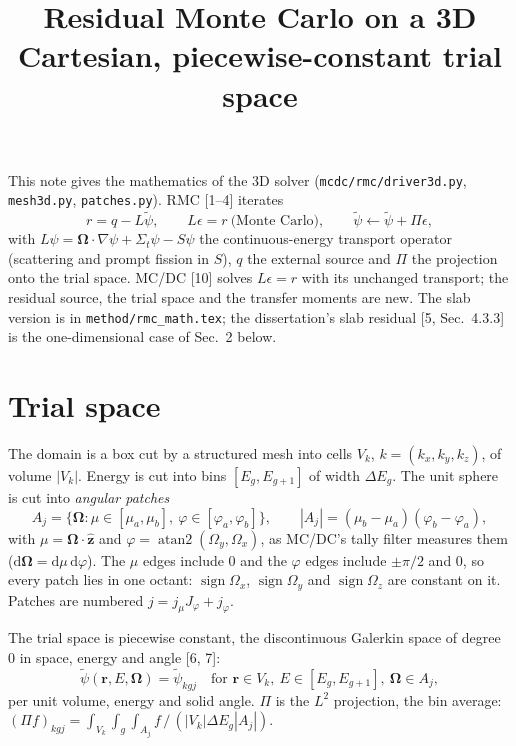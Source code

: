 \documentclass[11pt]{article}
\title{Residual Monte Carlo on a 3D Cartesian, piecewise-constant trial space}
\date{}
\newcommand{\tpsi}{\tilde\psi}
\newcommand{\Sigt}{\Sigma_t}
\newcommand{\Om}{\boldsymbol\Omega}
\begin{document}
\maketitle

\noindent This note gives the mathematics of the 3D solver
(\texttt{mcdc/rmc/driver3d.py}, \texttt{mesh3d.py}, \texttt{patches.py}). RMC
[1--4] iterates
\begin{equation}
  r = q - L\tpsi,\qquad L\epsilon = r\ \text{(Monte Carlo)},\qquad
  \tpsi \leftarrow \tpsi + \Pi\epsilon ,
\end{equation}
with $L\psi = \Om\cdot\nabla\psi + \Sigt\psi - S\psi$ the continuous-energy
transport operator (scattering and prompt fission in $S$), $q$ the external source
and $\Pi$ the projection onto the trial space. MC/DC [10] solves $L\epsilon=r$ with
its unchanged transport; the residual source, the trial space and the transfer
moments are new. The slab version is in \texttt{method/rmc\_math.tex}; the dissertation's
slab residual [5, Sec.~4.3.3] is the one-dimensional case of Sec.~2 below.

\section{Trial space}

The domain is a box cut by a structured mesh into cells $V_k$, $k=(k_x,k_y,k_z)$, of
volume $|V_k|$. Energy is cut into bins $[E_g,E_{g+1}]$ of width $\Delta E_g$. The
unit sphere is cut into \emph{angular patches}
\begin{equation}
  A_j = \{\Om : \mu\in[\mu_a,\mu_b],\ \varphi\in[\varphi_a,\varphi_b]\},\qquad
  |A_j| = (\mu_b-\mu_a)(\varphi_b-\varphi_a),
\end{equation}
with $\mu=\Om\cdot\hat{\mathbf z}$ and $\varphi=\operatorname{atan2}(\Omega_y,\Omega_x)$,
as MC/DC's tally filter measures them ($\mathrm d\Om=\mathrm d\mu\,\mathrm d\varphi$).
The $\mu$ edges include $0$ and the $\varphi$ edges include $\pm\pi/2$ and $0$, so
every patch lies in one octant: $\operatorname{sign}\Omega_x$,
$\operatorname{sign}\Omega_y$ and $\operatorname{sign}\Omega_z$ are constant on it.
Patches are numbered $j = j_\mu J_\varphi + j_\varphi$.

The trial space is piecewise constant, the discontinuous Galerkin space of degree 0
in space, energy and angle [6, 7]:
\begin{equation}
  \tpsi(\mathbf r,E,\Om) = \tpsi_{kgj}\quad\text{for } \mathbf r\in V_k,\
  E\in[E_g,E_{g+1}],\ \Om\in A_j,
\end{equation}
per unit volume, energy and solid angle. $\Pi$ is the $L^2$ projection, the bin
average: $(\Pi f)_{kgj} = \int_{V_k}\!\int_g\!\int_{A_j} f\,/\,(|V_k|\Delta E_g|A_j|)$.
\end{document}
